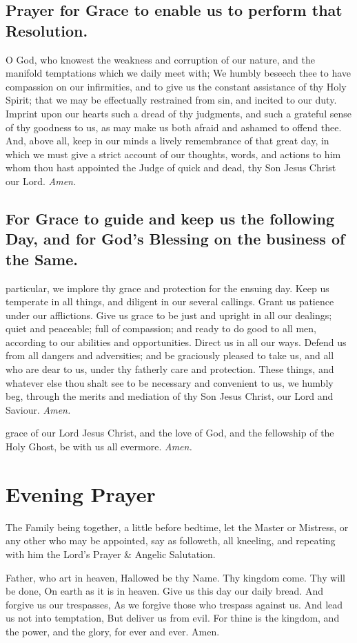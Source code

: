\clearpage
\subsection{Prayer for Grace to enable us to perform that Resolution.}
 O God, who knowest the weakness and corruption of our nature, and the manifold temptations which we daily meet with; We humbly beseech thee to have compassion on our infirmities, and to give us the constant assistance of thy Holy Spirit; that we may be effectually restrained from sin, and incited to our duty. Imprint upon our hearts such a dread of thy judgments, and such a grateful sense of thy goodness to us, as may make us both afraid and ashamed to offend thee. And, above all, keep in our minds a lively remembrance of that great day, in which we must give a strict account of our thoughts, words, and actions to him whom thou hast appointed the Judge of quick and dead, thy Son Jesus Christ our Lord. \textit{Amen.}
\subsection{For Grace to guide and keep us the following Day, and for God's Blessing on the business of the Same.}
 particular, we implore thy grace and protection for the ensuing day. Keep us temperate in all things, and diligent in our several callings. Grant us patience under our afflictions. Give us grace to be just and upright in all our dealings; quiet and peaceable; full of compassion; and ready to do good to all men, according to our abilities and opportunities. Direct us in all our ways. Defend us from all dangers and adversities; and be graciously pleased to take us, and all who are dear to us, under thy fatherly care and protection. These things, and whatever else thou shalt see to be necessary and convenient to us, we humbly beg, through the merits and mediation of thy Son Jesus Christ, our Lord and Saviour. \textit{Amen.}

 grace of our Lord Jesus Christ, {} and the love of God, and the fellowship of the Holy Ghost, be with us all evermore. \textit{Amen.}

\clearpage
\section{Evening Prayer}

\begin{secrubric}
    The Family being together, a little before bedtime, let the Master or Mistress, or any other who may be appointed, say as followeth, all kneeling, and repeating with him the Lord's Prayer \& Angelic Salutation.
\end{secrubric}
%
 Father, who art in heaven, Hallowed be thy Name. Thy kingdom come. Thy will be done, On earth as it is in heaven. Give us this day our daily bread. And forgive us our trespasses, As we forgive those who trespass against us. And lead us not into temptation, But deliver us from evil. For thine is the kingdom, and the power, and the glory, for ever and ever. Amen.\par

